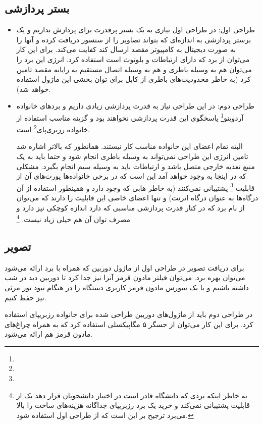 \documentclass{article}
\begin{document}
\subsection{بستر پردازشی}
\begin{itemize}
	\item طراحی اول: در طراحی اول نیازی به یک بستر پرقدرت برای پردازش نداریم
	و یک برستر پردازشی به اندازه‌ای که بتواند تصاویر را از سنسور دریافت کرده و آنها را به صورت دیجیتال به کامپیوتر مقصد ارسال کند کفایت می‌کند. برای این کار می‌توان از برد  که دارای ارتباطات  و بلوتوث است استفاده کرد. انرژی این برد را می‌توان هم به وسیله باطری و هم به وسیله اتصال  مستقیم به رایانه مقصد تامین کرد (به خاطر محدودیت‌های باطری‌ از کابل برای توان بخشی این ماژول استفاده خواهد شد).
	
	\item طراحی دوم: در این طراحی نیاز به قدرت پردازشی زیادی داریم و برد‌های خانواده آردوینو\footnote{} پاسخگوی این قدرت پردازشی نخواهند بود و گزینه مناسب استفاده از خانواده رزبری‌پای\footnote{} است.
	
	البته تمام اعضای این خانواده مناسب کار نیستند. همانطور که بالاتر اشاره شد تامین انرژی این طراحی نمی‌تواند به وسیله باطری انجام شود و حتما باید به یک منبع تغذیه خارجی متصل باشد و ارتباطات باید به وسیله سیم انجام بگیرد. مشکلی که در اینجا به وجود خواهد آمد این است که در برخی خانواده‌ها پورت‌های  آن از قابلیت \footnote{} پشتیبانی نمی‌کنند (به خاطر هابی که وجود دارد و همینطور استفاده از آن درگاه‌ها به عنوان درگاه اترنت) و تنها اعضای خاصی این قابلیت‌ را دارند که می‌توان از  نام برد که در کنار قدرت پردازشی مناسبی که دارد اندازه کوچکی نیز دارد و مصرف توان آن هم خیلی زیاد نیست.
	\footnote{به خاطر اینکه بردی که دانشگاه قادر است در اختیار دانشجویان قرار دهد یک از قابلیت  پشتیبانی نمی‌کند و خرید یک برد رزبریپای جداگانه هزینه‌های ساخت‌ را بالا می‌برد ترجیح بر این است که از طراحی اول استفاده شود.}
\end{itemize}

\subsection{تصویر}
برای دریافت تصویر در طراحی اول از ماژول دوربین که همراه با برد  ارائه می‌شود می‌توان بهره برد. می‌توان فیلتر مادون قرمز آنرا نیز جدا کرد تا دوربین دید در شب داشته باشیم   و با یک سورس مادون قرمز کاربری دستگاه را در هنگام نبود نور مرئی نیز حفظ کنیم.

در طراحی دوم باید از ماژول‌های دوربین طراحی شده برای خانواده رزبریپای استفاده کرد. برای این کار می‌توان از حسگر ۵ مگاپیکسلی  استفاده کرد که به همراه چراغ‌های مادون قرمز هم ارائه می‌شود.
\end{document}
